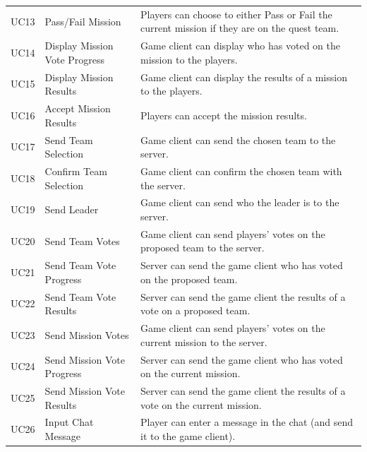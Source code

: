 \documentclass{hitec}
\begin{document}
\begin{longtable}{l|l| p{6cm}}
UC13          & Pass/Fail Mission             & Players can choose to either Pass or Fail the current mission if they are on the quest team.             \\
UC14          & Display Mission Vote Progress & Game client can display who has voted on the mission to the players.                                     \\
UC15          & Display Mission Results       & Game client can display the results of a mission to the players.                                         \\
UC16          & Accept Mission Results        & Players can accept the mission results.                                                                  \\
UC17          & Send Team Selection           & Game client can send the chosen team to the server.                                                      \\
UC18          & Confirm Team Selection        & Game client can confirm the chosen team with the server.                                                 \\
UC19          & Send Leader                   & Game client can send who the leader is to the server.                                                    \\
UC20          & Send Team Votes               & Game client can send players' votes on the proposed team to the server.                                  \\
UC21          & Send Team Vote Progress       & Server can send the game client who has voted on the proposed team.                                      \\
UC22          & Send Team Vote Results        & Server can send the game client the results of a vote on a proposed team.                                \\
UC23          & Send Mission Votes            & Game client can send players' votes on the current mission to the server.                                \\
UC24          & Send Mission Vote Progress    & Server can send the game client who has voted on the current mission.                                    \\
UC25          & Send Mission Vote Results     & Server can send the game client the results of a vote on the current mission.                            \\
UC26          & Input Chat Message            & Player can enter a message in the chat (and send it to the game client).                                 \\

\end{longtable}
\end{document}
